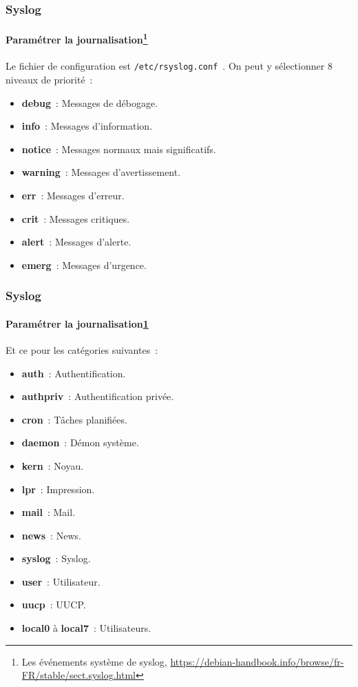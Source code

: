 \documentclass{beamer}
\begin{document}
    \begin{frame}
        \transdissolve
        \frametitle{Syslog}
        \framesubtitle{Paramétrer la journalisation\footnote{\label{syslog}Les événements système de syslog, \url{https://debian-handbook.info/browse/fr-FR/stable/sect.syslog.html}}}
        Le fichier de configuration est \lstinline{/etc/rsyslog.conf}~.
        \bigbreak
        On peut y sélectionner 8 niveaux de priorité~:
        \begin{itemize}
            \item \textbf{debug}~: Messages de débogage.
            \item \textbf{info}~: Messages d'information.
            \item \textbf{notice}~: Messages normaux mais significatifs.
            \item \textbf{warning}~: Messages d'avertissement.
            \item \textbf{err}~: Messages d'erreur.
            \item \textbf{crit}~: Messages critiques.
            \item \textbf{alert}~: Messages d'alerte.
            \item \textbf{emerg}~: Messages d'urgence.
        \end{itemize}
    \end{frame}

    \begin{frame}
        \transdissolve
        \frametitle{Syslog}
        \framesubtitle{Paramétrer la journalisation\cref{syslog}}
        Et ce pour les catégories suivantes~:
        \begin{itemize}
            \item \textbf{auth}~: Authentification.
            \item \textbf{authpriv}~: Authentification privée.
            \item \textbf{cron}~: Tâches planifiées.
            \item \textbf{daemon}~: Démon système.
            \item \textbf{kern}~: Noyau.
            \item \textbf{lpr}~: Impression.
            \item \textbf{mail}~: Mail.
            \item \textbf{news}~: News.
            \item \textbf{syslog}~: Syslog.
            \item \textbf{user}~: Utilisateur.
            \item \textbf{uucp}~: UUCP.
            \item \textbf{local0} à \textbf{local7}~: Utilisateurs.
        \end{itemize}
    \end{frame}
\end{document}
